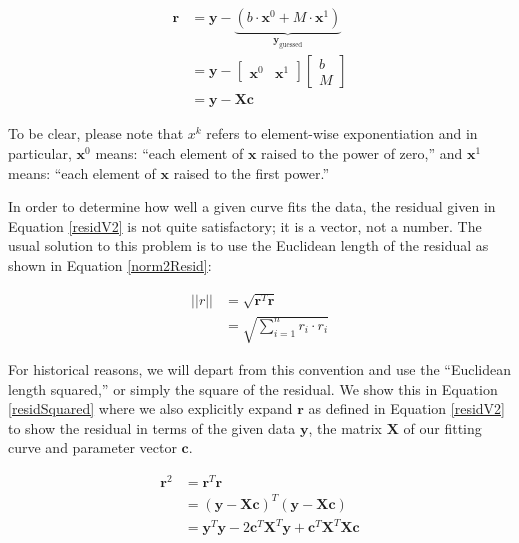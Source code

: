 \begin{equation}
\begin{split}
\mathbf{r} &= \mathbf{y} - \underbrace{\left( b \cdot \mathbf{x}^0 + M \cdot
\mathbf{x}^{1}\right)}_{\mathbf{y}_{\text{guessed}}} \\
 &= \mathbf{y} - 
\left[
\begin{matrix}
\mathbf{x}^{0} & \mathbf{x}^{1}
\end{matrix}
\right]
\left[
\begin{matrix}
b \\
M
\end{matrix}
\right] \\
&= \mathbf{y} - \mathbf{X}\mathbf{c}
\end{split}
\label{residV2}
\end{equation}

To be clear, please note that $x^{k}$ refers to element-wise exponentiation and in particular, $\mathbf{x}^{0}$ means: ``each element of $\mathbf{x}$ raised to the power of zero,'' and $\mathbf{x}^{1}$ means: ``each element of $\mathbf{x}$ raised to the first power.''  

In order to determine how well a given curve fits the data, the residual given in Equation \ref{residV2} is not quite satisfactory; it is a vector, not a number.  The usual solution to this problem is to use the Euclidean length of the residual as shown in Equation \ref{norm2Resid}:

\begin{equation}
\begin{split}
||r|| &= \sqrt{\mathbf{r}^{T} \mathbf{r}} \\
 &= \sqrt{\sum_{i=1}^{n} r_{i} \cdot r_{i}} 
\end{split} 
\label{norm2Resid}
\end{equation}

For historical reasons, we will depart from this convention and use the ``Euclidean length squared,'' or simply the square of the residual.  We show this in Equation \ref{residSquared} where we also explicitly expand $\mathbf{r}$ as defined in Equation \ref{residV2} to show the residual in terms of the given data $\mathbf{y}$, the matrix $\mathbf{X}$ of our fitting curve and parameter vector $\mathbf{c}$.

\begin{equation}
\begin{split}
\mathbf{r}^{2} &= \mathbf{r}^{T} \mathbf{r} \\
 &= \left(\mathbf{y} - \mathbf{X}\mathbf{c}\right)^{T}\left(\mathbf{y} -
\mathbf{X}\mathbf{c}\right) \\
&= \mathbf{y}^{T}\mathbf{y} - 2 \mathbf{c}^{T}\mathbf{X}^{T}\mathbf{y} +
\mathbf{c}^{T}\mathbf{X}^{T}\mathbf{X}\mathbf{c} 
\end{split}
\label{residSquared}
\end{equation}

